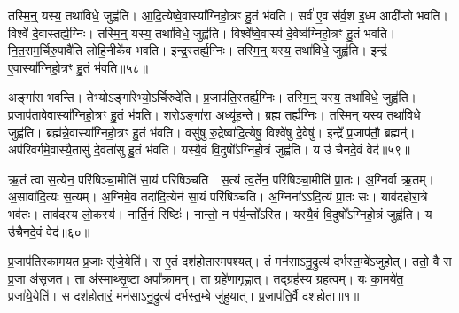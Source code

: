 तस्मि॒न्॒ यस्य॒ तथा॑विधे॒ जुह्व॑ति।
आ॒दि॒त्येष्वे॒वास्या᳚ग्निहो॒त्रꣳ हु॒तं भ॑वति।
सर्व॑ ए॒व स॑र्व॒श इ॒ध्म आदी᳚प्तो भवति।
विश्वे॑ दे॒वास्तर्ह्य॒ग्निः।
तस्मि॒न्॒ यस्य॒ तथा॑विधे॒ जुह्व॑ति।
विश्वे᳚ष्वे॒वास्य॑ दे॒वेष्व॑ग्निहो॒त्रꣳ हु॒तं भ॑वति।
नि॒त॒राम॒र्चिरु॒पावै॑ति लोहि॒नीके॑व भवति।
इन्द्र॒स्तर्ह्य॒ग्निः।
तस्मि॒न्॒ यस्य॒ तथा॑विधे॒ जुह्व॑ति।
इन्द्र॑ ए॒वास्या᳚ग्निहो॒त्रꣳ हु॒तं भ॑वति॥५८॥

अङ्गा॑रा भवन्ति।
तेभ्यो\-ऽङ्गा॑रेभ्यो॒\-ऽर्चिरुदे॑ति।
प्र॒जा\-प॑ति॒\-स्तर्ह्य॒ग्निः।
तस्मि॒न्॒ यस्य॒ तथा॑विधे॒ जुह्व॑ति।
प्र॒जा\-प॑तावे॒वास्या᳚ग्नि\-हो॒त्रꣳ हु॒तं भ॑वति।
शरोऽङ्गा॑रा॒ अध्यू॑हन्ते।
ब्रह्म॒ तर्ह्य॒ग्निः।
तस्मि॒न्॒ यस्य॒ तथा॑विधे॒ जुह्व॑ति।
ब्रह्म॑न्ने॒वास्या᳚ग्निहो॒त्रꣳ हु॒तं भ॑वति।
वसु॑षु रु॒द्रेष्वा॑दि॒त्येषु॒ विश्वे॑षु दे॒वेषु॑।
इन्द्रे᳚ प्र॒जा\-प॑तौ॒ ब्रह्मन्॑।
अप॑रिवर्गमे॒वास्यै॒तासु॑ दे॒वता॑सु हु॒तं भ॑वति।
यस्यै॒वं वि॒दुषो᳚\-ऽग्निहो॒त्रं जुह्व॑ति।
य उ॑ चैनदे॒वं वेद॑॥५९॥\anuvakamend[आ॒दि॒त्यास्तर्ह्य॒ग्निरिन्द्र॑ ए॒वास्या᳚ग्निहो॒त्रꣳ हु॒तं भ॑वति दे॒वेषु॑ च॒त्वारि॑ च (यद॒ग्निन्निहि॑तः प्रथ॒मꣳ सर्व॑ ए॒व नि॑त॒रामङ्गा॑राः॒ शरो\-ऽङ्गा॑रा॒ ब्रह्म॒ वसु॑ष्व॒ष्टौ॥)]

ऋ॒तं त्वा॑ स॒त्येन॒ परि॑षिञ्चा॒मीति॑ सा॒यं परि॑षिञ्चति।
स॒त्यं त्व॒र्तेन॒ परि॑षिञ्चा॒मीति॑ प्रा॒तः।
अ॒ग्निर्वा ऋ॒तम्।
अ॒सावा॑दि॒त्यः स॒त्यम्।
अ॒ग्निमे॒व तदा॑दि॒त्येन॑ सा॒यं परि॑षिञ्चति।
अ॒ग्निना॑\-ऽऽदि॒त्यं प्रा॒तः सः।
याव॑दहोरा॒त्रे भव॑तः।
ताव॑दस्य लो॒कस्य॑।
नार्ति॒र्न रिष्टिः॑।
नान्तो॒ न प॑र्य॒न्तो᳚\-ऽस्ति।
यस्यै॒वं वि॒दुषो᳚\-ऽग्निहो॒त्रं जुह्व॑ति।
य उ॑चैनदे॒वं वेद॑॥६०॥\anuvakamend[अ॒स्ति॒ द्वे च॑]




\clearpage
{}
\setcounter{anuvakam}{0}

प्र॒जा\-प॑तिरकामयत प्र॒जाः सृ॑जे॒येति॑।
स ए॒तं दश॑होतारम\-पश्यत्।
तं मन॑सा\-ऽनु॒द्रुत्य॑ दर्भस्त॒म्बे॑\-ऽजुहोत्।
ततो॒ वै स प्र॒जा अ॑\-सृजत।
ता अ॑स्माथ्सृ॒ष्टा अपा᳚क्रामन्।
ता ग्रहे॑णागृह्णात्।
तद्ग्रह॑स्य ग्रह॒त्वम्।
यः का॒मये॑त॒ प्रजा॑ये॒येति॑।
स दश॑होतारं॒ मन॑सा\-ऽनु॒द्रुत्य॑ दर्भस्त॒म्बे जु॑हुयात्।
प्र॒जा\-प॑ति॒र्वै दश॑होता॥१॥

